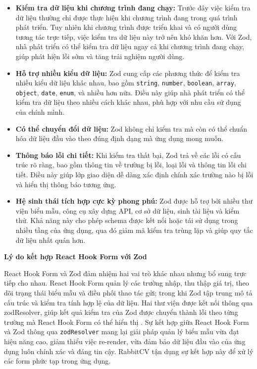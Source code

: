 \begin{itemize}
    \item \textbf{Kiểm tra dữ liệu khi chương trình đang chạy:} Trước đây việc kiểm tra dữ liệu thường chỉ được thực hiện khi chương trình đang trong quá trình phát triển. Tuy nhiên khi chương trình được triển khai và có người dùng tương tác trực tiếp, việc kiểm tra dữ liệu này trở nên khó khăn hơn. Với Zod, nhà phát triển có thể kiểm tra dữ liệu ngay cả khi chương trình đang chạy, giúp phát hiện lỗi sớm và tăng trải nghiệm người dùng.

    \item \textbf{Hỗ trợ nhiều kiểu dữ liệu:} Zod cung cấp các phương thức để kiểm tra nhiều kiểu dữ liệu khác nhau, bao gồm \texttt{string}, \texttt{number}, \texttt{boolean}, \texttt{array}, \texttt{object}, \texttt{date}, \texttt{enum}, và nhiều hơn nữa. Điều này giúp nhà phát triển có thể kiểm tra dữ liệu theo nhiều cách khác nhau, phù hợp với nhu cầu sử dụng của chính mình.

    \item \textbf{Có thể chuyển đổi dữ liệu:} Zod không chỉ kiểm tra mà còn có thể chuẩn hóa dữ liệu đầu vào theo đúng định dạng mà ứng dụng mong muốn.

    \item \textbf{Thông báo lỗi chi tiết:} Khi kiểm tra thất bại, Zod trả về các lỗi có cấu trúc rõ ràng, bao gồm thông tin về trường bị lỗi, loại lỗi và thông tin lỗi chi tiết. Điều này giúp lớp giao diện dễ dàng xác định chính xác trường nào bị lỗi và hiển thị thông báo tương ứng.
    
    \item \textbf{Hệ sinh thái tích hợp cực kỳ phong phú:} Zod được hỗ trợ bởi nhiều thư viện biểu mẫu, công cụ xây dựng API, cơ sở dữ liệu, sinh tài liệu và kiểm thử. Khả năng này cho phép schema được kết nối hoặc tái sử dụng trong nhiều tầng của ứng dụng, qua đó giảm mã kiểm tra trùng lặp và giúp quy tắc dữ liệu nhất quán hơn.
\end{itemize}


\medskip
\noindent\textbf{Lý do kết hợp React Hook Form với Zod}
\medskip

React Hook Form và Zod đảm nhiệm hai vai trò khác nhau nhưng bổ sung trực tiếp cho nhau. React Hook Form quản lý các trường nhập, thu thập giá trị, theo dõi trạng thái biểu mẫu và điều phối thao tác gửi; trong khi Zod tập trung mô tả cấu trúc và kiểm tra tính hợp lệ của dữ liệu. Hai thư viện được kết nối thông qua zodResolver, giúp kết quả kiểm tra của Zod được chuyển thành lỗi theo từng trường mà React Hook Form có thể hiển thị \cite{hookformresolvers}. Sự kết hợp giữa React Hook Form và Zod thông qua \texttt{zodResolver} mang lại giải pháp quản lý biểu mẫu vừa đạt hiệu năng cao, giảm thiểu việc re-render, vừa đảm bảo dữ liệu đầu vào của ứng dụng luôn chính xác và đáng tin cậy. RabbitCV tận dụng sự kết hợp này để xử lý các form phức tạp trong ứng dụng.

